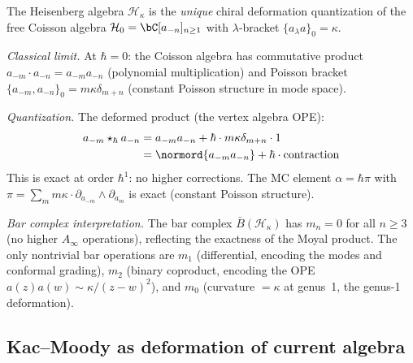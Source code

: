 \begin{computation}
\label{comp:moyal-chiral}

The Heisenberg algebra $\mathcal{H}_\kappa$ is the
\emph{unique} chiral deformation quantization of the free
Coisson algebra $\mathcal{H}_0 = \bC[a_{-n}]_{n \geq 1}$
with $\lambda$-bracket $\{a_\lambda a\}_0 = \kappa$.

\emph{Classical limit.}
At $\hbar = 0$: the Coisson algebra has commutative product
$a_{-m} \cdot a_{-n} = a_{-m} a_{-n}$ (polynomial multiplication)
and Poisson bracket $\{a_{-m}, a_{-n}\}_0 = m\kappa\delta_{m+n}$
(constant Poisson structure in mode space).

\emph{Quantization.}
The deformed product (the vertex algebra OPE):
\begin{align*}
a_{-m} \star_\hbar a_{-n}
&= a_{-m} a_{-n} + \hbar \cdot m\kappa\delta_{m+n} \cdot 1 \\
&= \normord{a_{-m} a_{-n}} + \hbar \cdot
\text{contraction}
\end{align*}
This is exact at order $\hbar^1$: no higher corrections.
The MC element $\alpha = \hbar \pi$ with
$\pi = \sum_m m\kappa \cdot \partial_{a_{-m}} \wedge
\partial_{a_m}$ is exact (constant Poisson structure).

\emph{Bar complex interpretation.}
The bar complex $\bar{B}(\mathcal{H}_\kappa)$ has
$m_n = 0$ for all $n \geq 3$ (no higher $A_\infty$ operations),
reflecting the exactness of the Moyal product.  The only
nontrivial bar operations are $m_1$ (differential, encoding the modes and conformal grading), $m_2$ (binary coproduct, encoding the OPE $a(z)a(w) \sim \kappa/(z-w)^2$), and $m_0$ (curvature $= \kappa$ at genus~1, the genus-1 deformation).
\end{computation}

\subsection{Kac--Moody as deformation of current algebra}

